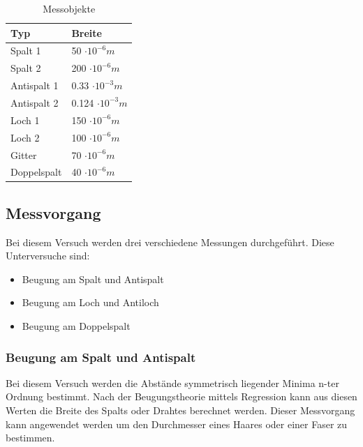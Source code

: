\begin{table}[h!]
	\centering
	\begin{tabular}{|l|l|}
		\hline
		\rowcolor[rgb]{0.89,0.89,0.89}
		\textbf{Typ} & \textbf{Breite}         \\ \hline
		Spalt 1      & 50    $ \cdot  10^{-6}m $    \\ \hline
		Spalt 2      & 200   $ \cdot  10^{-6}m $    \\ \hline
		Antispalt 1  & 0.33  $ \cdot  10^{-3}m $    \\ \hline
		Antispalt 2  & 0.124 $ \cdot  10^{-3}m $    \\ \hline
		Loch 1       & 150   $ \cdot  10^{-6}m $    \\ \hline
		Loch 2       & 100   $ \cdot  10^{-6}m $    \\ \hline
		Gitter       & 70    $ \cdot  10^{-6}m $    \\ \hline
		Doppelspalt  & 40    $ \cdot  10^{-6}m $    \\ \hline
	\end{tabular}
\caption{Messobjekte}
\label{table:messobjekte}
\end{table}
\newpage
\subsection{Messvorgang}
Bei diesem Versuch werden drei verschiedene Messungen durchgeführt. Diese Unterversuche sind:
\begin{itemize}
	\item Beugung am Spalt und Antispalt
	\item Beugung am Loch und Antiloch
	\item Beugung am Doppelspalt 
\end{itemize}

\subsubsection{Beugung am Spalt und Antispalt}\label{cap:Spalt}
Bei diesem Versuch werden die Abstände symmetrisch liegender Minima n-ter Ordnung bestimmt. Nach der Beugungstheorie mittels Regression kann aus diesen Werten die Breite des Spalts oder Drahtes berechnet werden. Dieser Messvorgang kann angewendet werden um den Durchmesser eines Haares oder einer Faser zu bestimmen.

